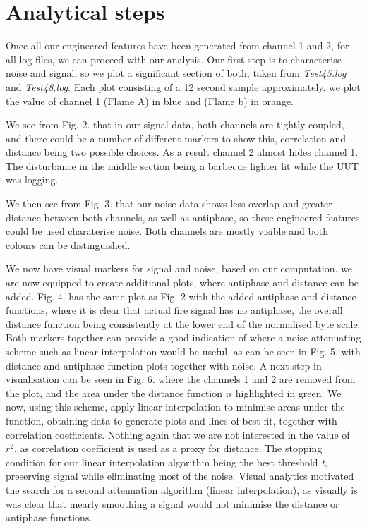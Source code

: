 \section{Analytical steps}

Once all our engineered features have been generated from channel 1 and 2, for all log files, we can proceed with our analysis.
Our first step is to characterise noise and signal, so we plot a significant section of both, taken from \textit{Test45.log} and \textit{Test48.log}. Each plot consisting of a 12 second sample approximately. we plot the value of channel 1 (Flame A) in blue and (Flame b) in orange. 

We see from Fig. 2. that in our signal data, both channels are tightly coupled, and there could be a number of different markers to show this, correlation and distance being two possible choices. As a result channel 2 almost hides channel 1. The disturbance in the middle section being a barbecue lighter lit while the UUT was logging.

We then see from Fig. 3. that our noise data shows less overlap and greater distance between both channels, as well as antiphase, so these engineered features could be used charaterise noise. Both channels are mostly visible and both colours can be distinguished.

We now have visual markers for signal and noise, based on our computation. we are now equipped to create additional plots, where antiphase and distance can be added. Fig. 4. has the same plot as Fig. 2 with the added antiphase and distance functions, where it is clear that actual fire signal has no antiphase, the overall distance function being consistently at the lower end of the normalised byte scale. Both markers together can provide a good indication of where a noise attenuating scheme such as linear interpolation would be useful, as can be seen in Fig. 5. with distance and antiphase function plots together with noise. A next step in visualisation can be seen in Fig. 6. where the channels 1 and 2 are removed from the plot, and the area under the distance function is highlighted in green. We now, using this scheme, apply linear interpolation to minimise areas under the function, obtaining data to generate plots and lines of best fit, together with correlation coefficients. Nothing again that we are not interested in the value of $ r^2 $, as correlation coefficient is used as a proxy for distance.
The stopping condition for our linear interpolation algorithm being the best threshold \textit{t}, preserving signal while eliminating most of the noise.
Visual analytics motivated the search for a second attenuation algorithm (linear interpolation), as visually is was clear that mearly smoothing a signal would not minimise the distance or antiphase functions.

